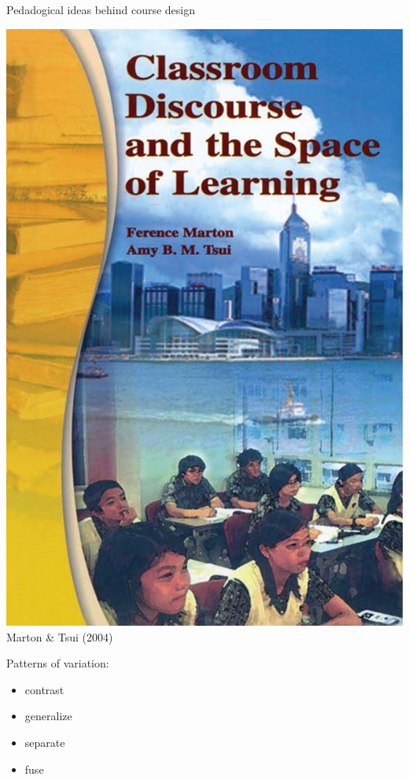 \documentclass[aspectratio=169]{beamer}
\newenvironment{Slide}[1]%
  {\begin{frame}[environment=Slide]{#1}}
  {\end{frame}}%
\begin{document}
\begin{Slide}{Pedadogical ideas behind course design}

  \begin{minipage}{0.22\textwidth}
    \includegraphics[height=0.52\textheight]{Pictures/marton}\\
    {\small Marton \& Tsui (2004)}
  \end{minipage}%
  \begin{minipage}{0.3\textwidth}
      Patterns of variation:
      \begin{itemize}
        \item contrast
        \item generalize
        \item separate
        \item fuse

\end{itemize}
\end{minipage}
\end{Slide}
\end{document}
